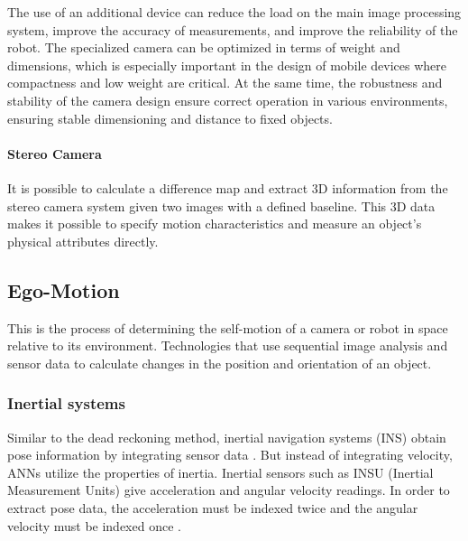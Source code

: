 The use of an additional device can reduce the load on the main image processing system, improve the accuracy of measurements, and improve the reliability of the robot. The specialized camera can be optimized in terms of weight and dimensions, which is especially important in the design of mobile devices where compactness and low weight are critical. At the same time, the robustness and stability of the camera design ensure correct operation in various environments, ensuring stable dimensioning and distance to fixed objects.

\paragraph{Stereo Camera}
It is possible to calculate a difference map and extract 3D information from the stereo camera system given two images with a defined baseline. This 3D data makes it possible to specify motion characteristics and measure an object's physical attributes directly.

\subsection{Ego-Motion}
This is the process of determining the self-motion of a camera or robot in space relative to its environment. Technologies that use sequential image analysis and sensor data to calculate changes in the position and orientation of an object.
\subsubsection{Inertial systems}
Similar to the dead reckoning method, inertial navigation systems (INS) obtain pose information by integrating sensor data \citep{biezad1999integrated}. But instead of integrating velocity, ANNs utilize the properties of inertia. Inertial sensors such as INSU (Inertial Measurement Units) give acceleration and angular velocity readings. In order to extract pose data, the acceleration must be indexed twice and the angular velocity must be indexed once \citep{grewal2020global}. 


